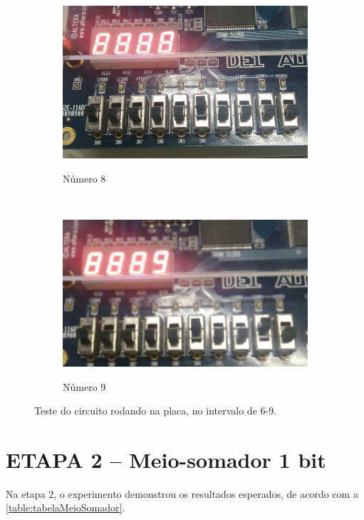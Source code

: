 \begin{figure}[H]
			\begin{subfigure}[b]{0.44\textwidth}
				\includegraphics[width=\textwidth]{img/etapa1/8}
				\label{fig:etapa1-8}
				\caption{Número 8}
			\end{subfigure}
			~
			\begin{subfigure}[b]{0.44\textwidth}
				\includegraphics[width=\textwidth]{img/etapa1/9}
				\label{fig:etapa1-9}
				\caption{Número 9}
			\end{subfigure}

			\caption{Teste do circuito rodando na placa, no intervalo de 6-9.}\label{fig:etapa1Teste2}
		\end{figure}


	\section{ETAPA 2 – Meio-somador 1 bit}
		Na etapa 2, o experimento demonstrou os resultados esperados, de acordo com a
		 \autoref{table:tabelaMeioSomador}.

